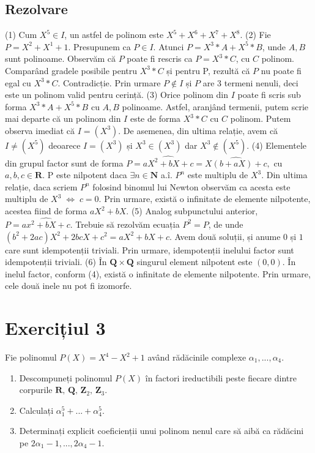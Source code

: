 \documentclass{article}
\DeclareRobustCommand\iff{\;\Longleftrightarrow\;}
\begin{document}
\subsection{Rezolvare}
(1) Cum $X^5 \in I$, un astfel de polinom este $X^5 + X^6 + X ^ 7 + X^8$.
\newline
(2) Fie $P=X^2 + X^1 + 1$. Presupunem ca $P \in I$. Atunci $P = X^3 * A + X^5 * B$, unde $A, B$ sunt polinoame. Observăm că $P$ poate fi rescris ca $P=X^3*C$, cu $C$ polinom. Comparând gradele posibile pentru $X^3*C$ și pentru P, rezultă că $P$ nu poate fi egal cu $X^3*C$. Contradicție. Prin urmare $P \not \in I$ și $P$ are 3 termeni nenuli, deci este un polinom valid pentru cerință.
\newline
(3) Orice polinom din $I$ poate fi scris sub forma $X^3 * A + X^5 * B$ cu $A, B$ polinoame. Astfel, aranjând termenii, putem scrie mai departe că un polinom din $I$ este de forma $X^3*C$ cu $C$ polinom. Putem observa imediat că $I=(X^3)$. De asemenea, din ultima relație, avem că $I \not = (X^5)$ deoarece $I=(X^3)$ și $X^3 \in (X^3)$ dar $X^3 \not \in (X^5)$.
\newline
(4) Elementele din grupul factor sunt de forma $P=\widehat{aX^2 + bX + c} = \widehat{X(b+aX) + c},$ cu $a, b, c \in \mathbf{R}.$ P este nilpotent daca $\exists n \in \mathbf{N}$ a.î. $P^n$ este multiplu de $X^3$. Din ultima relație, daca scriem $P^n$ folosind binomul lui Newton observăm ca acesta este multiplu de $X^3 \iff c = 0$. Prin urmare, există o infinitate de elemente nilpotente, acestea fiind de forma $aX^2 + bX$.
\newline
(5) Analog subpunctului anterior, $P=\widehat{ax^2 + bX + c}$. Trebuie să rezolvăm ecuația $P^2 = P$, de unde $(b^2 + 2ac)X^2 + 2bcX + c^2 = aX^2 + bX + c$. Avem două soluții, și anume $0$ și $1$ care sunt idempotenții triviali. Prin urmare, idempotenții inelului factor sunt idempotenții triviali.
\newline
(6) În $\mathbf{Q} \times \mathbf{Q}$ singurul element nilpotent este $(0, 0)$. În inelul factor, conform (4), există o infinitate de elemente nilpotente. Prin urmare, cele două inele nu pot fi izomorfe.


\section{Exercițiul 3}
Fie polinomul $P(X) = X^4 - X^2 + 1$ având rădăcinile complexe $\alpha_1, ..., \alpha_4$.
\begin{enumerate}
    \item  Descompuneți polinomul $P(X)$ în factori ireductibili peste fiecare dintre corpurile $\mathbf{R}, \, \mathbf{Q}, \, \mathbf{Z}_2, \, \mathbf{Z}_3$.
    \item Calculați $\alpha_1^5 + ... + \alpha_4^5$.
    \item Determinați explicit coeficienții unui polinom nenul care să aibă ca rădăcini pe $2 \alpha_1 - 1 , ..., 2 \alpha_4 - 1$.
\end{enumerate}
\end{document}
